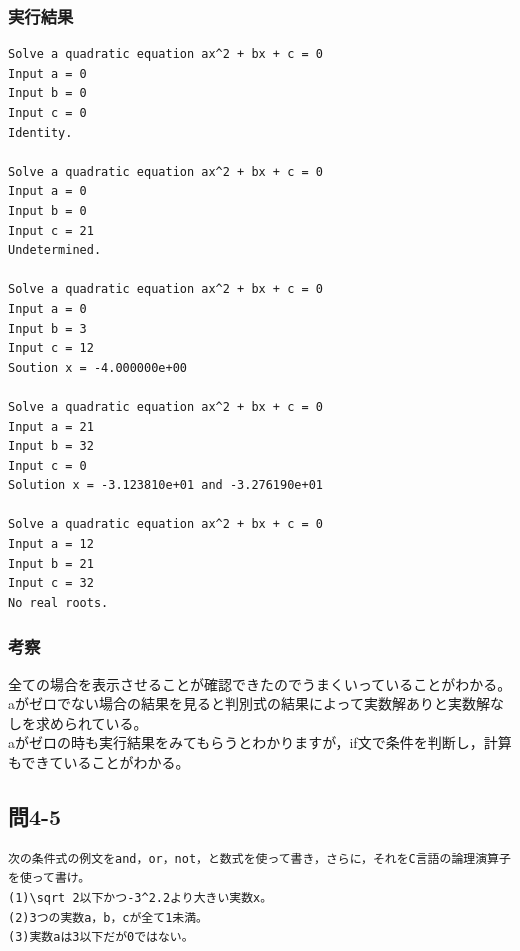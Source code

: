 \documentclass{jarticle}
\begin{document}
\subsubsection{実行結果\\}
\begin{breakbox}
\begin{verbatim}
Solve a quadratic equation ax^2 + bx + c = 0
Input a = 0
Input b = 0
Input c = 0
Identity.

Solve a quadratic equation ax^2 + bx + c = 0
Input a = 0
Input b = 0
Input c = 21
Undetermined.

Solve a quadratic equation ax^2 + bx + c = 0
Input a = 0
Input b = 3 
Input c = 12
Soution x = -4.000000e+00

Solve a quadratic equation ax^2 + bx + c = 0
Input a = 21
Input b = 32
Input c = 0
Solution x = -3.123810e+01 and -3.276190e+01

Solve a quadratic equation ax^2 + bx + c = 0
Input a = 12
Input b = 21
Input c = 32
No real roots.
\end{verbatim}
\end{breakbox}
\subsubsection{考察\\}
全ての場合を表示させることが確認できたのでうまくいっていることがわかる。\\
aがゼロでない場合の結果を見ると判別式の結果によって実数解ありと実数解なしを求められている。\\
aがゼロの時も実行結果をみてもらうとわかりますが，if文で条件を判断し，計算もできていることがわかる。\\


\subsection{問4-5\\}
\begin{verbatim}
次の条件式の例文をand，or，not，と数式を使って書き，さらに，それをC言語の論理演算子を使って書け。
(1)\sqrt 2以下かつ-3^2.2より大きい実数x。
(2)3つの実数a，b，cが全て1未満。
(3)実数aは3以下だが0ではない。
\end{verbatim}
\end{document}
